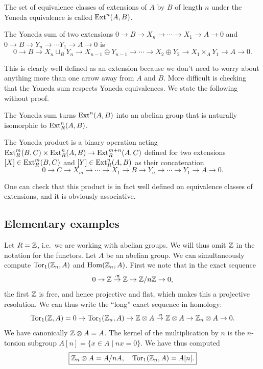 \begin{defn}
    The set of equivalence classes of extensions of $A$ by $B$ of length $n$ under the Yoneda equivalence is called $\operatorname{Ext}^n(A,B)$.
\end{defn}

\begin{defn}
    The Yoneda sum of two extensions $0\to B\to X_n\to\cdots \to X_1\to A\to 0$ and $0\to B\to Y_n\to \cdots Y_1\to A\to 0$ is 
    \[0\to B\to X_n\sqcup_B Y_n\to X_{n-1}\oplus Y_{n-1}\to \cdots \to X_2\oplus Y_2\to X_1\times_A Y_1\to A\to 0.\]
\end{defn}

This is clearly well defined as an extension because we don't need to worry about anything more than one arrow away from $A$ and $B$. More difficult is checking that the Yoneda sum respects Yoneda equivalences. We state the following without proof.

\begin{thm}
    The Yoneda sum turns $\operatorname{Ext}^n(A,B)$ into an abelian group that is naturally isomorphic to $\operatorname{Ext}^n_R(A,B)$.
\end{thm}


\begin{defn}
    The Yoneda product is a binary operation acting $\operatorname{Ext}^m_R(B,C)\times \operatorname{Ext}^n_R(A,B)\to \operatorname{Ext}^{m+n}_R(A,C)$ defined for two extensions $[X]\in \operatorname{Ext}^m_R(B,C)$ and $[Y]\in \operatorname{Ext}^n_R(A,B)$ as their concatenation
    \[0\to C\to X_m\to \cdots \to X_1\to B\to Y_n\to \cdots\to Y_1\to A\to 0.\]
\end{defn}

One can check that this product is in fact well defined on equivalence classes of extensions, and it is obviously associative.


\subsection{Elementary examples}

Let $R=\mathbb{Z}$, i.e.~we are working with abelian groups. We will thus omit $\mathbb{Z}$ in the notation for the functors. Let $A$ be an abelian group. We can simultaneously compute $\operatorname{Tor}_1(\mathbb{Z}_n,A)$ and $\operatorname{Hom}(\mathbb{Z}_n,A)$. First we note that in the exact sequence
\[0\to \mathbb{Z}\overset{\cdot n}{\to}\mathbb{Z}\to \mathbb{Z}\slash n\mathbb{Z} \to 0,\]
the first $\mathbb{Z}$ is free, and hence projective and flat, which makes this a projective resolution. We can thus write the ``long'' exact sequence in homology:
\[\operatorname{Tor}_1(\mathbb{Z},A)=0\to \operatorname{Tor}_1(\mathbb{Z}_n,A)\to \mathbb{Z}\otimes A\overset{\cdot n}{\to} \mathbb{Z}\otimes A\to \mathbb{Z}_n\otimes A\to 0.\]
We have canonically $\mathbb{Z}\otimes A=A$. The kernel of the multiplication by $n$ is the $n$-torsion subgroup $A[n]=\{x\in A\mid nx=0\}$. We have thus computed
\[\boxed{\mathbb{Z}_n\otimes A=A\slash nA,\quad \operatorname{Tor}_1(\mathbb{Z}_n,A)=A[n].}\]

